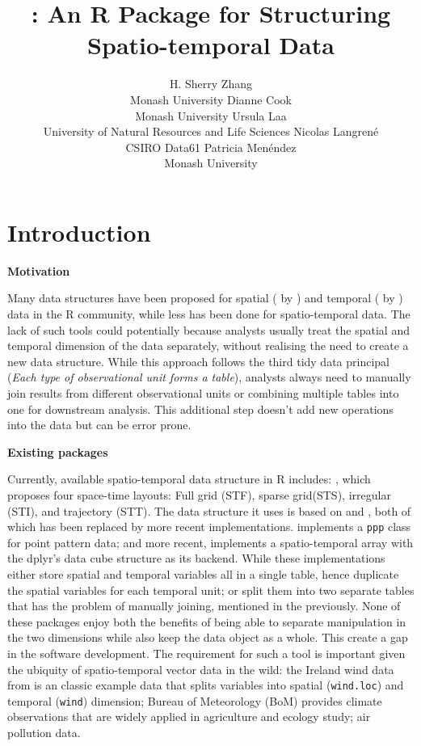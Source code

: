 \documentclass[
]{jss}
\author{
H. Sherry Zhang\\Monash University \And Dianne Cook\\Monash University
\AND Ursula Laa\\University of Natural Resources and Life Sciences
\AND Nicolas Langrené\\CSIRO Data61 \AND Patricia
Menéndez\\Monash University \AND
}
\title{\pkg{cubble}: An R Package for Structuring Spatio-temporal Data}
\begin{document}
\newpage

\hypertarget{introduction}{%
\section{Introduction}\label{introduction}}

\textbf{Motivation}

Many data structures have been proposed for spatial ( by
\citet{sf}) and temporal ( by \citet{tsibble}) data in the
R community, while less has been done for spatio-temporal data. The lack
of such tools could potentially because analysts usually treat the
spatial and temporal dimension of the data separately, without realising
the need to create a new data structure. While this approach follows the
third tidy data principal \citep{tidydata} (\emph{Each type of
observational unit forms a table}), analysts always need to manually
join results from different observational units or combining multiple
tables into one for downstream analysis. This additional step doesn't
add new operations into the data but can be error prone. \newline

\textbf{Existing packages}

Currently, available spatio-temporal data structure in R includes:
 \citep{spacetime}, which proposes four space-time
layouts: Full grid (STF), sparse grid(STS), irregular (STI), and
trajectory (STT). The data structure it uses is based on 
\citep{sp} and  \citep{xts}, both of which has been replaced by
more recent implementations.  \citep{spatstat} implements
a \texttt{ppp} class for point pattern data; and more recent,
 \citep{stars} implements a spatio-temporal array with the
dplyr's data cube structure  \citep{cubelyr} as its
backend. While these implementations either store spatial and temporal
variables all in a single table, hence duplicate the spatial variables
for each temporal unit; or split them into two separate tables that has
the problem of manually joining, mentioned in the previously. None of
these packages enjoy both the benefits of being able to separate
manipulation in the two dimensions while also keep the data object as a
whole. This create a gap in the software development. The requirement
for such a tool is important given the ubiquity of spatio-temporal
vector data in the wild: the Ireland wind data from  is an
classic example data that splits variables into spatial
(\texttt{wind.loc}) and temporal (\texttt{wind}) dimension; Bureau of
Meteorology (BoM) provides climate observations that are widely applied
in agriculture and ecology study; air pollution data. \newline
\end{document}
